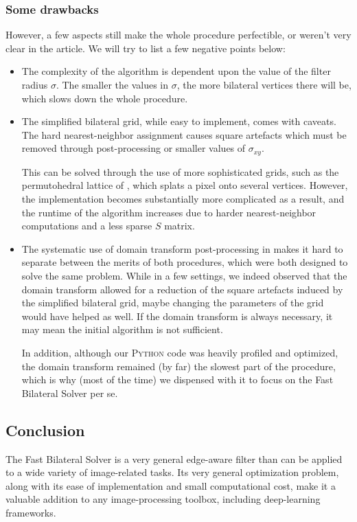 \documentclass{article}
\begin{document}
\subsubsection{Some drawbacks}

However, a few aspects still make the whole procedure perfectible, or weren't very clear in the article. We will try to list a few negative points below:

\begin{itemize}
    \item The complexity of the algorithm is dependent upon the value of the filter radius $\sigma$. The smaller the values in $\sigma$, the more bilateral vertices there will be, which slows down the whole procedure.
    
    \item The simplified bilateral grid, while easy to implement, comes with caveats. The hard nearest-neighbor assignment causes square artefacts which must be removed through post-processing or smaller values of $\sigma_{xy}$.
    
    This can be solved through the use of more sophisticated grids, such as the permutohedral lattice of \cite{adams_fast_2010}, which splats a pixel onto several vertices. However, the implementation becomes substantially more complicated as a result, and the runtime of the algorithm increases due to harder nearest-neighbor computations and a less sparse $S$ matrix.
    
    \item The systematic use of domain transform post-processing in \cite{barron_fast_2016} makes it hard to separate between the merits of both procedures, which were both designed to solve the same problem. While in a few settings, we indeed observed that the domain transform allowed for a reduction of the square artefacts induced by the simplified bilateral grid, maybe changing the parameters of the grid would have helped as well. If the domain transform is always necessary, it may mean the initial algorithm is not sufficient.
    
    In addition, although our \textsc{Python} code was heavily profiled and optimized, the domain transform remained (by far) the slowest part of the procedure, which is why (most of the time) we dispensed with it to focus on the Fast Bilateral Solver per se.
\end{itemize}

\subsection*{Conclusion}

The Fast Bilateral Solver is a very general edge-aware filter than can be applied to a wide variety of image-related tasks. Its very general optimization problem, along with its ease of implementation and small computational cost, make it a valuable addition to any image-processing toolbox, including deep-learning frameworks.

\newpage



\end{document}

